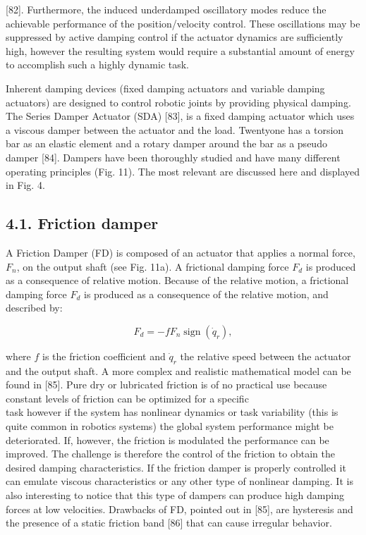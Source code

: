 \documentclass[10pt]{article}
\begin{document}
[82]. Furthermore, the induced underdamped oscillatory modes reduce the achievable performance of the position/velocity control. These oscillations may be suppressed by active damping control if the actuator dynamics are sufficiently high, however the resulting system would require a substantial amount of energy to accomplish such a highly dynamic task.

Inherent damping devices (fixed damping actuators and variable damping actuators) are designed to control robotic joints by providing physical damping. The Series Damper Actuator (SDA) [83], is a fixed damping actuator which uses a viscous damper between the actuator and the load. Twentyone has a torsion bar as an elastic element and a rotary damper around the bar as a pseudo damper [84]. Dampers have been thoroughly studied and have many different operating principles (Fig. 11). The most relevant are discussed here and displayed in Fig. 4.

\subsection*{4.1. Friction damper}
A Friction Damper (FD) is composed of an actuator that applies a normal force, $F_{n}$, on the output shaft (see Fig. 11a). A frictional damping force $F_{d}$ is produced as a consequence of relative motion. Because of the relative motion, a frictional damping force $F_{d}$ is produced as a consequence of the relative motion, and described by:


\begin{equation*}
F_{d}=-f F_{n} \operatorname{sign}\left(\dot{q}_{r}\right), \tag{2}
\end{equation*}


where $f$ is the friction coefficient and $\dot{q}_{r}$ the relative speed between the actuator and the output shaft. A more complex and realistic mathematical model can be found in [85]. Pure dry or lubricated friction is of no practical use because constant levels of friction can be optimized for a specific\\[0pt]
task however if the system has nonlinear dynamics or task variability (this is quite common in robotics systems) the global system performance might be deteriorated. If, however, the friction is modulated the performance can be improved. The challenge is therefore the control of the friction to obtain the desired damping characteristics. If the friction damper is properly controlled it can emulate viscous characteristics or any other type of nonlinear damping. It is also interesting to notice that this type of dampers can produce high damping forces at low velocities. Drawbacks of FD, pointed out in [85], are hysteresis and the presence of a static friction band [86] that can cause irregular behavior.
\end{document}
